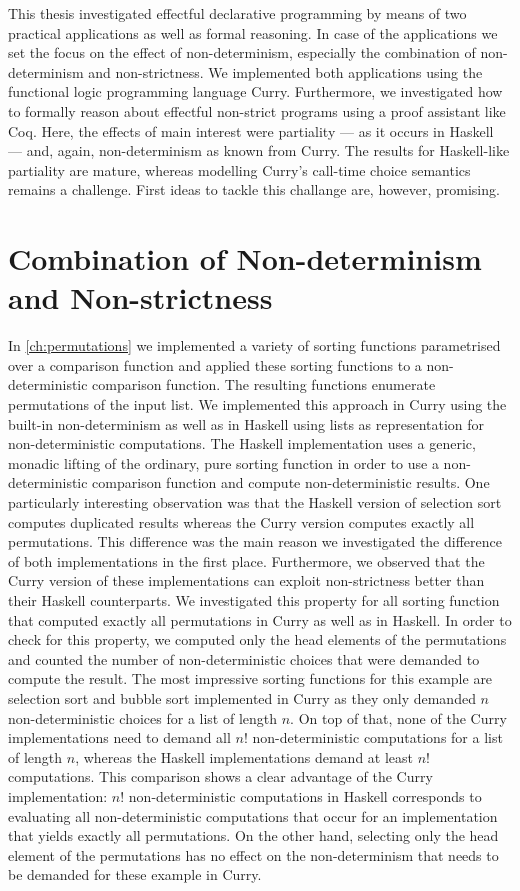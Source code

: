 %

This thesis investigated effectful declarative programming by means of two practical applications as well as formal reasoning.
In case of the applications we set the focus on the effect of non-determinism, especially the combination of non-determinism and non-strictness.
We implemented both applications using the functional logic programming language Curry.
Furthermore, we investigated how to formally reason about effectful non-strict programs using a proof assistant like Coq.
Here, the effects of main interest were partiality --- as it occurs in Haskell --- and, again, non-determinism as known from Curry.
The results for Haskell-like partiality are mature, whereas modelling Curry's call-time choice semantics remains a challenge.
First ideas to tackle this challange are, however, promising.

\section{Combination of Non-determinism and Non-strictness}

In \autoref{ch:permutations} we implemented a variety of sorting functions parametrised over a comparison function and applied these sorting functions to a non-deterministic comparison function.
The resulting functions enumerate permutations of the input list.
We implemented this approach in Curry using the built-in non-determinism as well as in Haskell using lists as representation for non-deterministic computations.
The Haskell implementation uses a generic, monadic lifting of the ordinary, pure sorting function in order to use a non-deterministic comparison function and compute non-deterministic results.
One particularly interesting observation was that the Haskell version of selection sort computes duplicated results whereas the Curry version computes exactly all permutations.
This difference was the main reason we investigated the difference of both implementations in the first place.
Furthermore, we observed that the Curry version of these implementations can exploit non-strictness better than their Haskell counterparts.
We investigated this property for all sorting function that computed exactly all permutations in Curry as well as in Haskell.
In order to check for this property, we computed only the head elements of the permutations and counted the number of non-deterministic choices that were demanded to compute the result.
The most impressive sorting functions for this example are selection sort and bubble sort implemented in Curry as they only demanded $n$ non-deterministic choices for a list of length $n$.
On top of that, none of the Curry implementations need to demand all $n!$ non-deterministic computations for a list of length $n$, whereas the Haskell implementations demand at least $n!$ computations.
This comparison shows a clear advantage of the Curry implementation: $n!$ non-deterministic computations in Haskell corresponds to evaluating all non-deterministic computations that occur for an implementation that yields exactly all permutations.
On the other hand, selecting only the head element of the permutations has no effect on the non-determinism that needs to be demanded for these example in Curry.

